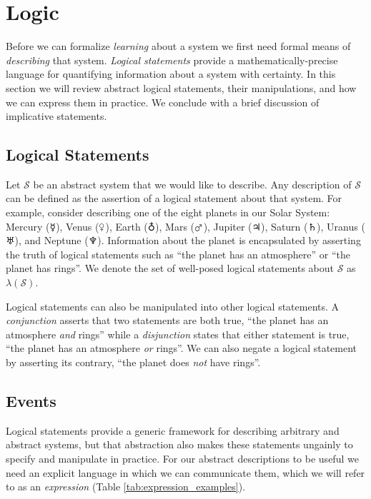 \chapter{Logic}

Before we can formalize \emph{learning} about a system we first need formal 
means of \emph{describing} that system.  \emph{Logical statements} provide a
mathematically-precise language for quantifying information about a system with 
certainty.  In this section we will review abstract logical statements, their manipulations, 
and how we can express them in practice.  We conclude with a brief discussion 
of implicative statements.

\section{Logical Statements}

Let $\mathcal{S}$ be an abstract system that we would like to describe.
Any description of $\mathcal{S}$ can be defined as the assertion of a logical 
statement about that system.  For example, consider describing one of the 
eight planets in our Solar System: Mercury ($\mercury$), Venus ($\venus$), 
Earth ($\earth$), Mars ($\mars$), Jupiter ($\jupiter$), Saturn ($\saturn$), 
Uranus ($\uranus$), and Neptune ($\neptune$).  Information about the planet 
is encapsulated by asserting the truth of logical statements such as ``the planet 
has an atmosphere'' or ``the planet has rings''.  We denote the set of well-posed
logical statements about $\mathcal{S}$ as $\lambda \! \left( \mathcal{S} \right)$.

Logical statements can also be manipulated into other logical statements.
A \emph{conjunction} asserts that two statements are both true, ``the planet 
has an atmosphere \emph{and} rings'' while a \emph{disjunction} states that 
either statement is true, ``the planet has an atmosphere \emph{or} rings''.  
We can also negate a logical statement by asserting its contrary, ``the planet 
does \emph{not} have rings''.

\section{Events}

Logical statements provide a generic framework for describing arbitrary and
abstract systems, but that abstraction also makes these statements ungainly 
to specify and manipulate in practice.  For our abstract descriptions to be useful 
we need an explicit language in which we can communicate them, which we
will refer to as an \emph{expression} (Table \ref{tab:expression_examples}).

